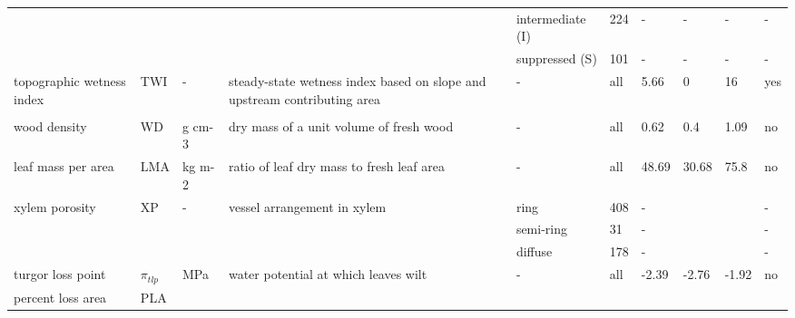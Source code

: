 \documentclass[]{article}
\begin{document}
\begin{table}[!h]
{\begin{tabular}{lll>{\raggedright\arraybackslash}p{7cm}llllll}
\hspace{1em}\hspace{1em} &  &  &  & intermediate (I) & 224 & - & - & - & -\\
\hspace{1em}\hspace{1em} &  &  &  & suppressed (S) & 101 & - & - & - & -\\
\hspace{1em}\hspace{1em}topographic wetness index & TWI & - & steady-state wetness index based on slope and upstream contributing area & - & all & 5.66 & 0 & 16 & yes\\
\addlinespace[.4em]
\multicolumn{1}{l}{\textit{species' traits}}\\
\hspace{1em}\hspace{1em}wood density & WD & g cm-3 & dry mass of a unit volume of fresh wood & - & all & 0.62 & 0.4 & 1.09 & no\\
\hspace{1em}\hspace{1em}leaf mass per area & LMA & kg m-2 & ratio of leaf dry mass to fresh leaf area & - & all & 48.69 & 30.68 & 75.8 & no\\
\hspace{1em}\hspace{1em}xylem porosity & XP & - & vessel arrangement in xylem & ring & 408 & - &  &  & -\\
\hspace{1em}\hspace{1em} &  &  &  & semi-ring & 31 & - &  &  & -\\
\hspace{1em}\hspace{1em} &  &  &  & diffuse & 178 & - &  &  & -\\
\hspace{1em}\hspace{1em}turgor loss point & $\pi_{tlp}$ & MPa & water potential at which leaves wilt & - & all & -2.39 & -2.76 & -1.92 & no\\
\hspace{1em}\hspace{1em}percent loss area & PLA & %
\bottomrule
\end{tabular}}
\end{table}
\end{document}
